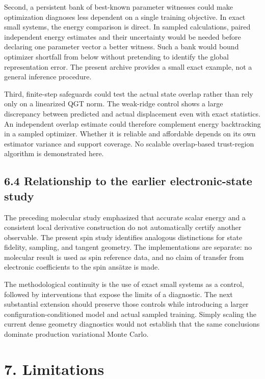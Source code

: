 \documentclass[
  11pt,
  a4paper,
]{article}
\begin{document}
Second, a persistent bank of best-known parameter witnesses could make
optimization diagnoses less dependent on a single training objective. In
exact small systems, the energy comparison is direct. In sampled
calculations, paired independent energy estimates and their uncertainty
would be needed before declaring one parameter vector a better witness.
Such a bank would bound optimizer shortfall from below without
pretending to identify the global representation error. The present
archive provides a small exact example, not a general inference
procedure.

Third, finite-step safeguards could test the actual state overlap rather
than rely only on a linearized QGT norm. The weak-ridge control shows a
large discrepancy between predicted and actual displacement even with
exact statistics. An independent overlap estimate could therefore
complement energy backtracking in a sampled optimizer. Whether it is
reliable and affordable depends on its own estimator variance and
support coverage. No scalable overlap-based trust-region algorithm is
demonstrated here.

\hypertarget{relationship-to-the-earlier-electronic-state-study}{%
\subsection{6.4 Relationship to the earlier electronic-state
study}\label{relationship-to-the-earlier-electronic-state-study}}

The preceding molecular study emphasized that accurate scalar energy and
a consistent local derivative construction do not automatically certify
another observable. The present spin study identifies analogous
distinctions for state fidelity, sampling, and tangent geometry. The
implementations are separate: no molecular result is used as spin
reference data, and no claim of transfer from electronic coefficients to
the spin ansätze is made.

The methodological continuity is the use of exact small systems as a
control, followed by interventions that expose the limits of a
diagnostic. The next substantial extension should preserve those
controls while introducing a larger configuration-conditioned model and
actual sampled training. Simply scaling the current dense geometry
diagnostics would not establish that the same conclusions dominate
production variational Monte Carlo.

\hypertarget{limitations}{%
\section{7. Limitations}\label{limitations}}
\end{document}
